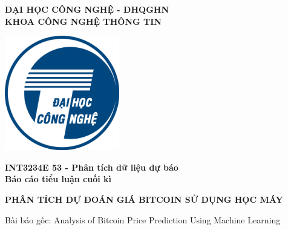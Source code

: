 % 







\thispagestyle{empty}
\begin{center} \centering
    \textbf{ĐẠI HỌC CÔNG NGHỆ - ĐHQGHN}\\
    \textbf{KHOA CÔNG NGHỆ THÔNG TIN}\\
\end{center}

\begin{center}
\includegraphics[width = 3\linewidth, height = 5cm, keepaspectratio]{UET_logo.png}
\vspace{15 mm}
\begin{spacing}{1.0}
\textbf{\large {INT3234E 53 - Phân tích dữ liệu dự báo}}\\
\textbf{\large {Báo cáo tiểu luận cuối kì}}\\
\end{spacing}
\vspace{10 mm}

\begin{spacing}{2.0}
\textbf{\LARGE {PHÂN TÍCH DỰ ĐOÁN GIÁ BITCOIN SỬ DỤNG HỌC MÁY}}
\end{spacing}

\vspace{5 mm}

\begin{spacing}{0.8}
{\large {Bài báo gốc: Analysis of Bitcoin Price Prediction Using Machine Learning}}
\end{spacing}
\end{center}



